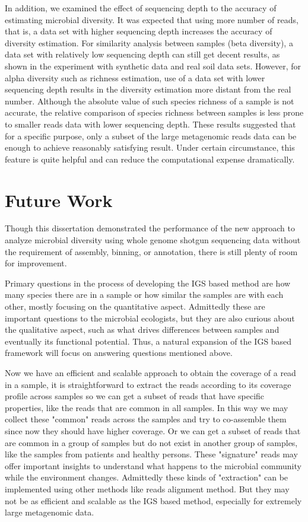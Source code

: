 In addition, we examined the effect of sequencing depth to the accuracy of 
estimating microbial diversity.
It was expected that using more number of reads, that is, a data set with higher sequencing
depth increases the accuracy of diversity estimation. For similarity analysis 
between samples (beta diversity), a data set with relatively
low sequencing depth can still get decent results, as shown in the experiment
with synthetic data and real soil data sets. However, for alpha diversity such as richness
estimation, use of a data set with lower sequencing depth results in the diversity estimation
more distant from the real number. Although the absolute value of such species
richness of a sample is not accurate, the relative comparison of species
richness between samples is less prone to smaller reads data with lower
sequencing depth. These results suggested that for a specific
purpose, only a subset of the large metagenomic reads data can be enough to
achieve reasonably satisfying result. Under certain circumstance, this feature
is quite helpful and can reduce the computational expense dramatically. 


\section{Future Work}


Though this dissertation demonstrated the performance of the new approach to 
analyze microbial diversity
using whole genome shotgun sequencing data without the requirement of assembly,
binning, or annotation, there is still plenty of room for improvement.  

Primary questions in the process of developing the IGS based method are how many
species there are in a sample or how similar the samples are with each
other, mostly focusing on the quantitative aspect. Admittedly these are 
important questions to the microbial ecologists, but they are also
curious about the qualitative aspect, such as what drives differences between samples
and eventually its functional potential\cite{Xu2014}.  Thus, a natural 
expansion of the IGS based framework will focus on
answering questions mentioned above. 

Now we have an efficient and scalable approach to obtain the coverage of a read in
a sample, it is straightforward to extract the reads according to its coverage
profile across samples so we can get a subset of reads that have specific
properties, like the reads that are common in all samples. In this way we
may collect these "common" reads across the samples and try to co-assemble
them since now they should have higher coverage. Or we can get a subset of
reads that are common in a group of samples but do not exist in another group
of samples, like the samples from patients and healthy persons. These
"signature" reads may offer important insights to understand what happens
to the microbial community while the environment changes. Admittedly these
kinds of "extraction" can be implemented using other methods like reads 
alignment method. But they may not be as efficient and scalable as the IGS
based method, especially for extremely large metagenomic data.



